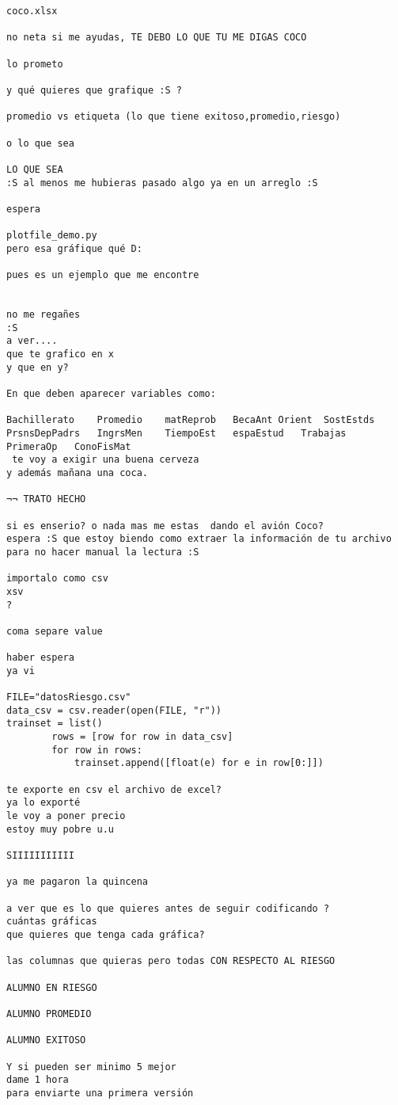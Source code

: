 \begin{verbatim}
coco.xlsx

no neta si me ayudas, TE DEBO LO QUE TU ME DIGAS COCO

lo prometo

y qué quieres que grafique :S ?

promedio vs etiqueta (lo que tiene exitoso,promedio,riesgo)

o lo que sea

LO QUE SEA
:S al menos me hubieras pasado algo ya en un arreglo :S

espera

plotfile_demo.py
pero esa gráfique qué D:

pues es un ejemplo que me encontre


no me regañes
:S
a ver....
que te grafico en x
y que en y?

En que deben aparecer variables como:

Bachillerato	Promedio	matReprob	BecaAnt	Orient	SostEstds	PrsnsDepPadrs	IngrsMen	TiempoEst	espaEstud	Trabajas	PrimeraOp	ConoFisMat
 te voy a exigir una buena cerveza
y además mañana una coca.

¬¬ TRATO HECHO

si es enserio? o nada mas me estas  dando el avión Coco?
espera :S que estoy biendo como extraer la información de tu archivo para no hacer manual la lectura :S

importalo como csv
xsv
?

coma separe value

haber espera
ya vi

FILE="datosRiesgo.csv"
data_csv = csv.reader(open(FILE, "r"))
trainset = list()
        rows = [row for row in data_csv]
        for row in rows:
            trainset.append([float(e) for e in row[0:]])

te exporte en csv el archivo de excel?
ya lo exporté
le voy a poner precio 
estoy muy pobre u.u

SIIIIIIIIIII

ya me pagaron la quincena

a ver que es lo que quieres antes de seguir codificando ?
cuántas gráficas
que quieres que tenga cada gráfica?

las columnas que quieras pero todas CON RESPECTO AL RIESGO

ALUMNO EN RIESGO

ALUMNO PROMEDIO

ALUMNO EXITOSO

Y si pueden ser minimo 5 mejor 
dame 1 hora
para enviarte una primera versión


\end{verbatim}

